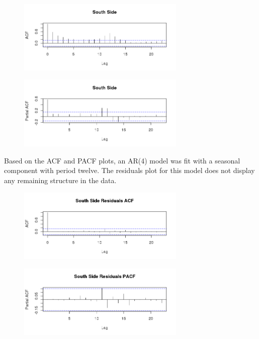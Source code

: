 \documentclass{article} %
\begin{document}
\begin{multicols}{2}
\begin{figure}[H]
\includegraphics[width=80mm]{Plots/south_ACF.png}
\end{figure}

\begin{figure}
\includegraphics[width=80mm]{Plots/south_PACF.png}
\end{figure}
\end{multicols}

\noindent Based on the ACF and PACF plots, an AR(4) model was fit with a seasonal component with period twelve. The residuals plot for this model does not display any remaining structure in the data. 

\begin{multicols}{2}
\begin{figure}[H]
\includegraphics[width=80mm]{Plots/south_resid_ACF.png}
\end{figure}

\begin{figure}
\includegraphics[width=80mm]{Plots/south_resid_PACF.png}
\end{figure}
\end{multicols}
\end{document}
